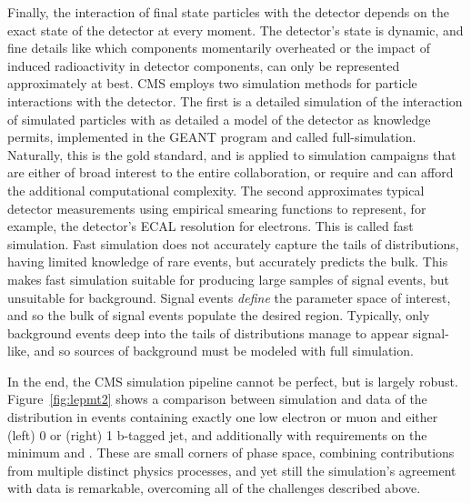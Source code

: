   Finally, the interaction of final state particles with the detector depends on the exact state of the detector at every moment.
  The detector's state is dynamic, and fine details like which components momentarily overheated or the impact of induced radioactivity in detector components, can only be represented approximately at best.
  CMS employs two simulation methods for particle interactions with the detector.
  The first is a detailed simulation of the interaction of simulated particles with as detailed a model of the detector as knowledge permits, implemented in the GEANT program \cite{GEANT} and called full-simulation.
  Naturally, this is the gold standard, and is applied to simulation campaigns that are either of broad interest to the entire collaboration, or require and can afford the additional computational complexity.
  The second approximates typical detector measurements using empirical smearing functions to represent, for example, the detector's ECAL resolution for electrons.
  This is called fast simulation.
  Fast simulation does not accurately capture the tails of distributions, having limited knowledge of rare events, but accurately predicts the bulk.
  This makes fast simulation suitable for producing large samples of signal events, but unsuitable for background.
  Signal events {\it define} the parameter space of interest, and so the bulk of signal events populate the desired region.
  Typically, only background events deep into the tails of distributions manage to appear signal-like, and so sources of background must be modeled with full simulation.

  In the end, the CMS simulation pipeline cannot be perfect, but is largely robust.
  Figure~\ref{fig:lepmt2} shows a comparison between simulation and data of the \mttwo distribution in events containing exactly one low \Mt electron or muon and either (left) 0 or (right) 1 b-tagged jet, and additionally with requirements on the minimum \Ht and \met.
  These are small corners of phase space, combining contributions from multiple distinct physics processes, and yet still the simulation's agreement with data is remarkable, overcoming all of the challenges described above.

